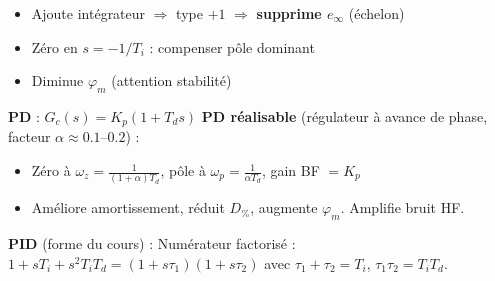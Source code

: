 \begin{tcolorbox}[colback=ch6teal!5,colframe=ch6teal!80!black,title={R\'egulateur PI}]
\begin{itemize}
  \item Ajoute int\'egrateur $\Rightarrow$ type $+1$ $\Rightarrow$ \textbf{supprime $e_\infty$} (\'echelon)
  \item Z\'ero en $s = -1/T_i$ : compenser p\^ole dominant
  \item Diminue $\varphi_m$ (attention stabilit\'e)
\end{itemize}
\end{tcolorbox}

\begin{tcolorbox}[colback=ch6teal!5,colframe=ch6teal!80!black,title={R\'egulateur PD \& PID}]
\textbf{PD} : $\boxed{G_c(s) = K_p(1 + T_d s)}$ \quad \textbf{PD r\'ealisable} (\og r\'egulateur \`a avance de phase\fg{}, facteur $\alpha\approx0.1$--$0.2$) :
\begin{itemize}
  \item Z\'ero \`a $\omega_z = \frac{1}{(1{+}\alpha)T_d}$, p\^ole \`a $\omega_p = \frac{1}{\alpha T_d}$, gain BF $= K_p$
  \item Am\'eliore amortissement, r\'eduit $D_\%$, augmente $\varphi_m$. Amplifie bruit HF.
\end{itemize}
\textbf{PID} (forme du cours) :
Num\'erateur factoris\'e : $1{+}sT_i{+}s^2 T_i T_d = (1{+}s\tau_1)(1{+}s\tau_2)$ avec $\tau_1{+}\tau_2 = T_i$, $\tau_1\tau_2 = T_i T_d$.
\end{tcolorbox}

